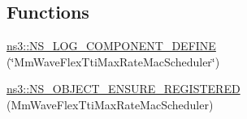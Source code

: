 \subsection*{Functions}
\begin{DoxyCompactItemize}
\item 
\hyperlink{namespacens3_a1ab85c4abcfbbbab1a9063457f4cb144}{ns3\+::\+N\+S\+\_\+\+L\+O\+G\+\_\+\+C\+O\+M\+P\+O\+N\+E\+N\+T\+\_\+\+D\+E\+F\+I\+NE} (\char`\"{}Mm\+Wave\+Flex\+Tti\+Max\+Rate\+Mac\+Scheduler\char`\"{})
\item 
\hyperlink{namespacens3_ab9f920a623b99b8d608e379b5b227b3d}{ns3\+::\+N\+S\+\_\+\+O\+B\+J\+E\+C\+T\+\_\+\+E\+N\+S\+U\+R\+E\+\_\+\+R\+E\+G\+I\+S\+T\+E\+R\+ED} (Mm\+Wave\+Flex\+Tti\+Max\+Rate\+Mac\+Scheduler)
\end{DoxyCompactItemize}
